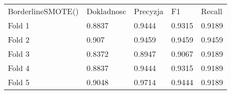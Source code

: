 \begin{tabular}{lllll}
\hline
 BorderlineSMOTE() & Dokladnosc & Precyzja & F1     & Recall \\
 Fold 1            & 0.8837     & 0.9444   & 0.9315 & 0.9189 \\
 Fold 2            & 0.907      & 0.9459   & 0.9459 & 0.9459 \\
 Fold 3            & 0.8372     & 0.8947   & 0.9067 & 0.9189 \\
 Fold 4            & 0.8837     & 0.9444   & 0.9315 & 0.9189 \\
 Fold 5            & 0.9048     & 0.9714   & 0.9444 & 0.9189 \\
\hline
\end{tabular}